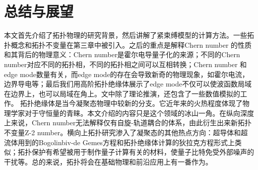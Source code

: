 \chapter{总结与展望}
本文首先介绍了拓扑物理的研究背景，然后讲解了紧束缚模型的计算方法。一些拓扑概念和拓扑不变量在第三章中被引入。之后的重点是解释Chern number 的性质和其背后的物理意义：Chern number是霍尔电导量子化的来源；不同的Chern number对应不同的拓扑相，不同的拓扑相之间可以互相转换；Chern number 和edge mode数量有关，而edge mode的存在会导致新奇的物理现象，如霍尔电流，边界导电等；最后我们用高阶拓扑绝缘体展示了edge mode不仅可以使波函数局域在边界上，也可以局域在角上。文中除了理论推演，还包含了一些数值模拟的工作。
拓扑绝缘体是当今凝聚态物理中较新的分支。它近年来的火热程度体现了物理学家对于守恒量的青睐。本文介绍的内容只是这个领域的冰山一角。在纵向深度上来说，Chern number无法解释仅有自旋-轨道耦合的体系，由此衍生出来新拓扑不变量Z-2 number。横向上拓扑研究渗入了凝聚态的其他热点方向：超导体和超流体用到的Bogolinbiv-de Gemes方程和拓扑绝缘体计算的狄拉克方程形式上类似；拓扑保护有希望被用于制作量子计算有关的材料，使量子比特免受外部噪声的干扰等。总的来说，拓扑将会在基础物理和前沿应用上有一番作为。